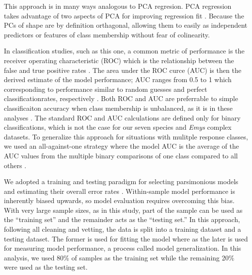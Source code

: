 \documentclass[12pt,letterpaper]{article}
\begin{document}
This approach is in many ways analogous to PCA regresion. PCA regression takes advantage of two aspects of PCA for improving regression fit \citep{Hastie2009}. Because the PCs of shape are by definition orthagonal, allowing them to easily as independent predictors or features of class membership without fear of colinearity.

In classification studies, such as this one, a common metric of performance is the receiver operating characteristic (ROC) which is the relationship between the false and true positive rates \citep{Hastie2009}. The area under the ROC curce (AUC) is then the derived estimate of the model performance; AUC ranges from 0.5 to 1 which corresponding to performance similar to random guesses and perfect classificationrates, respectively \citep{Hastie2009}. Both ROC and AUC are preferrable to simple classificaiton accuracy when class membership is unbalanced, as it is in these analyses \citep{Hastie2009}. The standard ROC and AUC calculations are defined only for binary classifications, which is not the case for our seven species and \textit{Emys} complex datasets. To generalize this approach for situations with mulitple response classes, we used an all-against-one strategy where the model AUC is the average of the AUC values from the multiple binary comparisons of one class compared to all others \citep{Hand2001}. 


We adopted a training and testing paradigm for selecting parsimonious models and estimating their overall error rates \citep{Hastie2009,Kuhn2013}. Within-sample model performance is inherently biased upwards, so model evaluation requires overcoming this bias. With very large sample sizes, as in this study, part of the sample can be used as the ``training set'' and the remainder acts as the ``testing set.'' In this approach, following all cleaning and vetting, the data is split into a training dataset and a testing dataset. The former is used for fitting the model where as the later is used for measuring model performance, a process called model generalization. In this analysis, we used 80\% of samples as the training set while the remaining 20\% were used as the testing set. 
\end{document}
